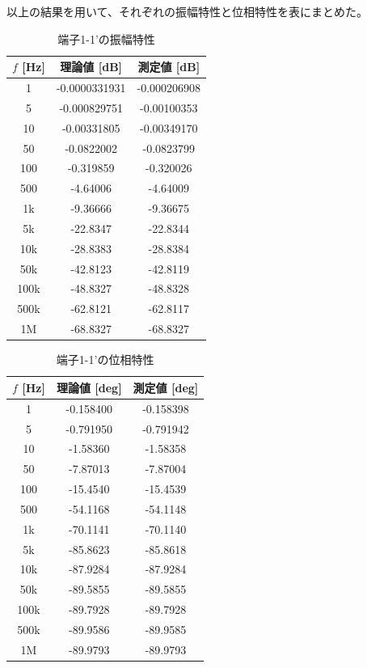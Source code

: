 \documentclass[article]{jlreq}
\begin{document}
以上の結果を用いて、それぞれの振幅特性と位相特性を表にまとめた。
\begin{table}[H]
\centering
\caption{端子1-1'の振幅特性}
\begin{tabular}{ccc}
\hline
$f$ [Hz] & 理論値 [dB] & 測定値 [dB] \\
\hline
1       & -0.0000331931 & -0.000206908 \\
5       & -0.000829751  & -0.00100353 \\
10      & -0.00331805   & -0.00349170 \\
50      & -0.0822002    & -0.0823799 \\
100     & -0.319859     & -0.320026 \\
500     & -4.64006      & -4.64009 \\
1k      & -9.36666      & -9.36675 \\
5k      & -22.8347      & -22.8344 \\
10k     & -28.8383      & -28.8384 \\
50k     & -42.8123      & -42.8119 \\
100k    & -48.8327      & -48.8328 \\
500k    & -62.8121      & -62.8117 \\
1M      & -68.8327      & -68.8327 \\
\hline
\end{tabular}
\end{table}
\begin{table}[H]
\centering
\caption{端子1-1'の位相特性}
\begin{tabular}{ccc}
\hline
$f$ [Hz] & 理論値 [deg] & 測定値 [deg] \\
\hline
1       & -0.158400 & -0.158398 \\
5       & -0.791950 & -0.791942 \\
10      & -1.58360  & -1.58358 \\
50      & -7.87013  & -7.87004 \\
100     & -15.4540  & -15.4539 \\
500     & -54.1168  & -54.1148 \\
1k      & -70.1141  & -70.1140 \\
5k      & -85.8623  & -85.8618 \\
10k     & -87.9284  & -87.9284 \\
50k     & -89.5855  & -89.5855 \\
100k    & -89.7928  & -89.7928 \\
500k    & -89.9586  & -89.9585 \\
1M      & -89.9793  & -89.9793 \\
\hline
\end{tabular}
\end{table}
\end{document}
